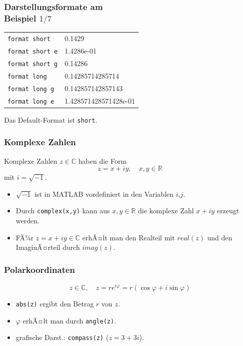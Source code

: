 %
%
\begin{frame}[fragile]\frametitle{Darstellungsformate am \\ Beispiel $1/7$}
\begin{tabular}{ll}
\alert{ \lstinline!format short!} &  0.1429 \\
\alert{ \lstinline!format short e! }& 1.4286e-01\\
\alert{ \lstinline!format short g! }&0.14286\\
\alert{ \lstinline!format long! }& 0.14285714285714\\
\alert{ \lstinline!format long g! }& 0.142857142857143\\
\alert{ \lstinline!format long e! }& 1.428571428571428e-01\\
\end{tabular}
Das Default-Format ist \lstinline!short!. 
\end{frame}
%
%
\begin{frame}[fragile]\frametitle{Komplexe Zahlen}
Komplexe Zahlen $z \in \mathbb{C}$ haben die Form
\[ z = x +iy, \quad x,y \in \mathbb{R} \]
mit $i=\sqrt{-1}$. 
\begin{itemize}
\item $\sqrt{-1}$ ist in MATLAB vordefiniert in den Variablen $i$,$j$.
\item Durch \lstinline!complex(x,y)!  kann aus $x,y \in
  \mathbb{R}$ die komplexe Zahl $x + iy$ erzeugt werden.
\item FÃ¼r $z=x+iy \in \mathbb{C}$ erhÃ¤lt man den Realteil mit
  $real(z)$ und den ImaginÃ¤rteil durch $imag(z)$. 
\end{itemize} 
\end{frame}
\begin{frame}[fragile]\frametitle{Polarkoordinaten}
\alert{ \[ z \in \mathbb{C}, \quad z=re^{i \varphi}=r(\cos \varphi + i \sin
  \varphi) \]}
\begin{itemize}
\item \lstinline!abs(z)! ergibt den Betrag $r$ von $z$.
\item $\varphi$ erhÃ¤lt man durch \lstinline!angle(z)!.
\item grafische Darst.:  \lstinline!compass(z)! ($z=3+3i$). \\
 \\ 
\end{itemize}
\end{frame}

